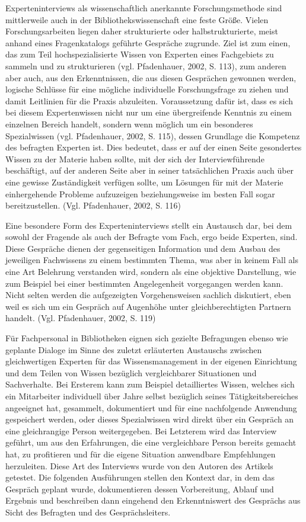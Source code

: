 \documentclass[a4paper,
fontsize=11pt,
oneside,
numbers=noperiodatend,
parskip=half-,
bibliography=totoc,
final
]{scrartcl}
\begin{document}
Experteninterviews als wissenschaftlich anerkannte Forschungsmethode
sind mittlerweile auch in der Bibliothekswissenschaft eine feste Größe.
Vielen Forschungsarbeiten liegen daher strukturierte oder
halbstrukturierte, meist anhand eines Fragenkatalogs geführte Gespräche
zugrunde. Ziel ist zum einen, das zum Teil hochspezialisierte Wissen von
Experten eines Fachgebiets zu sammeln und zu strukturieren (vgl.
Pfadenhauer, 2002, S. 113), zum anderen aber auch, aus den
Erkenntnissen, die aus diesen Gesprächen gewonnen werden, logische
Schlüsse für eine mögliche individuelle Forschungsfrage zu ziehen und
damit Leitlinien für die Praxis abzuleiten. Voraussetzung dafür ist,
dass es sich bei diesem Expertenwissen nicht nur um eine übergreifende
Kenntnis zu einem einzelnen Bereich handelt, sondern wenn möglich um ein
besonderes Spezialwissen (vgl. Pfadenhauer, 2002, S. 115), dessen
Grundlage die Kompetenz des befragten Experten ist. Dies bedeutet, dass
er auf der einen Seite gesondertes Wissen zu der Materie haben sollte,
mit der sich der Interviewführende beschäftigt, auf der anderen Seite
aber in seiner tatsächlichen Praxis auch über eine gewisse Zuständigkeit
verfügen sollte, um Lösungen für mit der Materie einhergehende Probleme
aufzuzeigen beziehungsweise im besten Fall sogar bereitzustellen. (Vgl.
Pfadenhauer, 2002, S. 116)

Eine besondere Form des Experteninterviews stellt ein Austausch dar, bei
dem sowohl der Fragende als auch der Befragte vom Fach, ergo beide
Experten, sind. Diese Gespräche dienen der gegenseitigen Information und
dem Ausbau des jeweiligen Fachwissens zu einem bestimmten Thema, was
aber in keinem Fall als eine Art Belehrung verstanden wird, sondern als
eine objektive Darstellung, wie zum Beispiel bei einer bestimmten
Angelegenheit vorgegangen werden kann. Nicht selten werden die
aufgezeigten Vorgehensweisen sachlich diskutiert, eben weil es sich um
ein Gespräch auf Augenhöhe unter gleichberechtigten Partnern handelt.
(Vgl. Pfadenhauer, 2002, S. 119)

Für Fachpersonal in Bibliotheken eignen sich gezielte Befragungen ebenso
wie geplante Dialoge im Sinne des zuletzt erläuterten Austauschs
zwischen gleichwertigen Experten für das Wissensmanagement in der
eigenen Einrichtung und dem Teilen von Wissen bezüglich vergleichbarer
Situationen und Sachverhalte. Bei Ersterem kann zum Beispiel
detailliertes Wissen, welches sich ein Mitarbeiter individuell über
Jahre selbst bezüglich seines Tätigkeitsbereiches angeeignet hat,
gesammelt, dokumentiert und für eine nachfolgende Anwendung gespeichert
werden, oder dieses Spezialwissen wird direkt über ein Gespräch an eine
gleichrangige Person weitergegeben. Bei Letzterem wird das Interview
geführt, um aus den Erfahrungen, die eine vergleichbare Person bereits
gemacht hat, zu profitieren und für die eigene Situation anwendbare
Empfehlungen herzuleiten. Diese Art des Interviews wurde von den Autoren
des Artikels getestet. Die folgenden Ausführungen stellen den Kontext
dar, in dem das Gespräch geplant wurde, dokumentieren dessen
Vorbereitung, Ablauf und Ergebnis und beschreiben dann eingehend den
Erkenntniswert des Gesprächs aus Sicht des Befragten und des
Gesprächsleiters.
\end{document}
